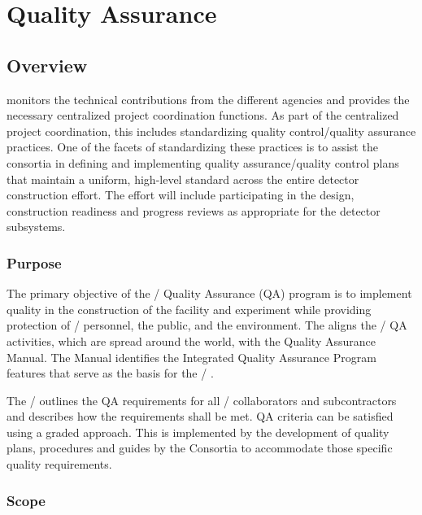 \chapter{Quality Assurance}
\label{vl:tc-QA}

\section{Overview}

  monitors the technical contributions from
the different agencies and provides the necessary centralized project
coordination functions. As part of the centralized project
coordination, this includes standardizing quality control/quality
assurance practices. One of the facets of standardizing these
practices is to assist the consortia in defining and implementing
quality assurance/quality control plans that maintain a uniform,
high-level standard across the entire detector construction
effort. The  effort will include participating in the
design, construction readiness and progress reviews as appropriate for
the  detector subsystems.

\subsection{Purpose}

The primary objective of the / Quality Assurance (QA) program
is to implement quality in the construction of the  facility and
 experiment while providing protection of / personnel, the
public, and the environment. The  aligns the / QA
activities, which are spread around the world, with the \fnal
Quality Assurance Manual. The Manual identifies the \fnal
Integrated Quality Assurance Program features that serve as the basis
for the / .

The /  outlines the QA requirements for all /
collaborators and subcontractors and describes how the requirements
shall be met. QA criteria can be satisfied using a graded
approach. This  is implemented by the development of quality
plans, procedures and guides by the Consortia to accommodate those
specific quality requirements.

\subsection{Scope}

